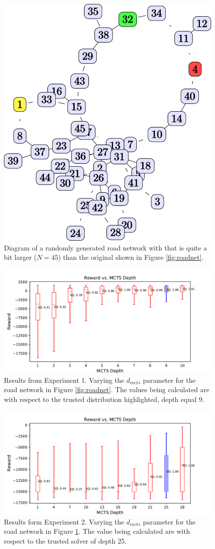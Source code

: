 \begin{figure}[tbp]
    \centering
    \includegraphics[width=0.4\linewidth]{Figures/medium_roadnet.png}
    \caption{Diagram of a randomly generated road network with that is quite a bit larger ($N=45$) than the original shown in Figure \ref{fig:roadnet}.}
    \label{fig:med_roadnet}
\end{figure}

\begin{figure}[tbp]
    \centering
    \includegraphics[width=1.0\linewidth]{Figures/sq_roadnet_mcts_i100e1000.pdf}
    \caption{Results from Experiment 1. Varying the $d_{mcts}$ parameter for the road network in Figure \ref{fig:roadnet}. The \xQ{} values being calculated are with respect to the trusted distribution highlighted, depth equal 9.}
    \label{fig:mcts_d}
\end{figure}
\begin{figure}[tbp]
    \centering
    \includegraphics[width=1.0\linewidth]{Figures/sq_mednet_mcts_i1000e2000.pdf}
    \caption{Results form Experiment 2. Varying the $d_{mcts}$ parameter for the road network in Figure \ref{fig:med_roadnet}. The \xQ{} value being calculated are with respect to the trusted solver of depth 25.}
    \label{fig:mcts_d_med}
\end{figure}

